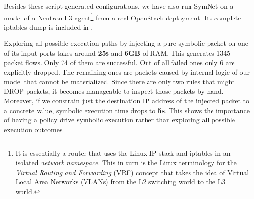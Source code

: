 \bigskip

Besides these script-generated configurations, we have also run SymNet on a
model of a Neutron L3 agent\footnote{It is essentially a router that uses the
Linux IP stack and iptables in an isolated \emph{network namespace}.  This in
turn is the Linux terminology for the \emph{Virtual Routing and Forwarding}
(VRF) concept that takes the idea
of Virtual Local Area Networks (VLANs)
from the L2 switching world to the L3 world.} from a real OpenStack deployment.
Its complete iptables dump is included in
.

Exploring all possible execution paths by injecting a pure symbolic packet on
one of its input ports takes around \textbf{25s} and \textbf{6GB} of RAM.  This
generates 1345 packet flows.  Only 74 of them are successful.  Out of all
failed ones only 6 are explicitly dropped.  The remaining ones are packets
caused by internal logic of our model that cannot be materialized.  Since there
are only two rules that might DROP packets, it becomes manageable to inspect
those packets by hand.  Moreover, if we constrain just the destination IP
address of the injected packet to a concrete value, symbolic execution time
drops to \textbf{5s}.  This shows the importance of having a policy drive
symbolic execution rather than exploring all possible execution outcomes.
